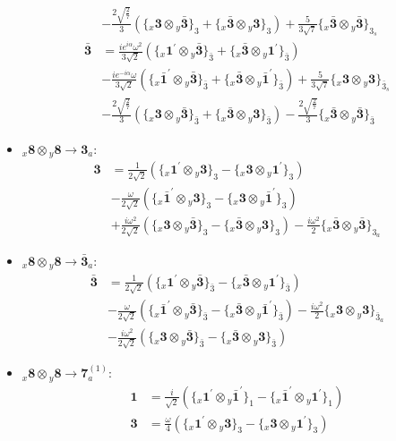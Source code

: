 \documentclass[english]{article}
\newcommand{\rep}[1]{\mathbf{#1}}
\newcommand{\repx}[2]{{}_{#2}\mathbf{#1}}
\newcommand{\subcg}[3]{\big\{ \repx{#1}{x}\otimes\repx{#2}{y}\big\}^{}_{#3}}
\begin{document}
\begin{itemize}
\begin{align*}
 & -\frac{2 \sqrt{\frac{2}{7}}}{3}\left(\subcg{3}{\bar{3}}{3}+\subcg{\bar{3}}{3}{3}\right)+\frac{5}{3 \sqrt{7}}\subcg{\bar{3}}{\bar{3}}{3_{s}}
\\
\rep{\bar{3}} & = \frac{i e^{i \alpha } \omega ^2}{3 \sqrt{2}}\left(\subcg{1^{\prime}}{\bar{3}}{\bar{3}}+\subcg{\bar{3}}{1^{\prime}}{\bar{3}}\right) \\ 
 & -\frac{i e^{-i \alpha } \omega }{3 \sqrt{2}}\left(\subcg{\bar{1}^{\prime}}{\bar{3}}{\bar{3}}+\subcg{\bar{3}}{\bar{1}^{\prime}}{\bar{3}}\right)+\frac{5}{3 \sqrt{7}}\subcg{3}{3}{\bar{3}_{s}} \\ 
 & -\frac{2 \sqrt{\frac{2}{7}}}{3}\left(\subcg{3}{\bar{3}}{\bar{3}}+\subcg{\bar{3}}{3}{\bar{3}}\right)-\frac{2 \sqrt{\frac{2}{7}}}{3}\subcg{\bar{3}}{\bar{3}}{\bar{3}}
\end{align*}
\item $\repx{8}{x}\otimes\repx{8}{y}\to\rep{3}_{a}$:
\begin{align*}
\rep{3} & = \frac{1}{2 \sqrt{2}}\left(\subcg{1^{\prime}}{3}{3}-\subcg{3}{1^{\prime}}{3}\right) \\ 
 & -\frac{\omega }{2 \sqrt{2}}\left(\subcg{\bar{1}^{\prime}}{3}{3}-\subcg{3}{\bar{1}^{\prime}}{3}\right) \\ 
 & +\frac{i \omega ^2}{2 \sqrt{2}}\left(\subcg{3}{\bar{3}}{3}-\subcg{\bar{3}}{3}{3}\right)-\frac{i \omega ^2}{2}\subcg{\bar{3}}{\bar{3}}{3_{a}}
\end{align*}
\item $\repx{8}{x}\otimes\repx{8}{y}\to\rep{\bar{3}}_{a}$:
\begin{align*}
\rep{\bar{3}} & = \frac{1}{2 \sqrt{2}}\left(\subcg{1^{\prime}}{\bar{3}}{\bar{3}}-\subcg{\bar{3}}{1^{\prime}}{\bar{3}}\right) \\ 
 & -\frac{\omega }{2 \sqrt{2}}\left(\subcg{\bar{1}^{\prime}}{\bar{3}}{\bar{3}}-\subcg{\bar{3}}{\bar{1}^{\prime}}{\bar{3}}\right)-\frac{i \omega ^2}{2}\subcg{3}{3}{\bar{3}_{a}} \\ 
 & -\frac{i \omega ^2}{2 \sqrt{2}}\left(\subcg{3}{\bar{3}}{\bar{3}}-\subcg{\bar{3}}{3}{\bar{3}}\right)
\end{align*}
\item $\repx{8}{x}\otimes\repx{8}{y}\to\rep{7}_{a}^{(1)}$:
\begin{align*}
\rep{1} & = \frac{i}{\sqrt{2}}\left(\subcg{1^{\prime}}{\bar{1}^{\prime}}{1}-\subcg{\bar{1}^{\prime}}{1^{\prime}}{1}\right)
\\
\rep{3} & = \frac{\omega }{4}\left(\subcg{1^{\prime}}{3}{3}-\subcg{3}{1^{\prime}}{3}\right) \\ 

\end{align*}
\end{itemize}
\end{document}
